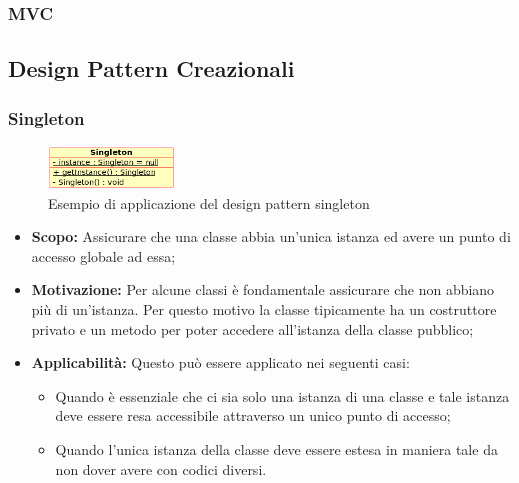 \documentclass{scalatekids-article}
\begin{document}
\subsubsection{MVC}

\subsection{Design Pattern Creazionali}

\subsubsection{Singleton}

\begin{figure}[H]
  \begin{center}
    \includegraphics[width=0.3\textwidth, keepaspectratio]{img/designPattern/Singleton.png}
    \caption{Esempio di applicazione del design pattern singleton}
  \end{center}
\end{figure}

\begin{itemize}

\item \textbf{Scopo:} Assicurare che una classe abbia un'unica istanza ed avere
un punto di accesso globale ad essa;

\item \textbf{Motivazione:} Per alcune classi è fondamentale assicurare che non
abbiano più di un'istanza. Per questo motivo la classe tipicamente ha un
costruttore privato e un metodo per poter accedere all'istanza della classe
pubblico;

\item \textbf{Applicabilità:} Questo  può essere
applicato nei seguenti casi:
   \begin{itemize}
   \item Quando è essenziale che ci sia solo una istanza di una classe e tale
   istanza deve essere resa accessibile attraverso un unico punto di accesso;
   \item Quando l'unica istanza della classe deve essere estesa in maniera
   tale da non dover avere  con codici diversi.
   \end{itemize}

\end{itemize}
\end{document}
